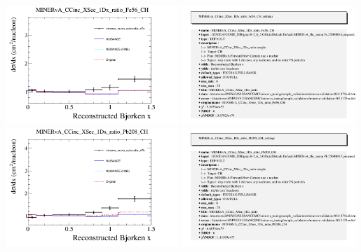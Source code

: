 \documentclass{article}
\begin{document}
\centering
\includegraphics[width=0.49\textwidth]{figures/minerva_numu_ccincratio_xFe_comp.png}
\includegraphics[width=0.49\textwidth]{figures/minerva_numu_ccincratio_xFe_info.png}
\centering
\includegraphics[width=0.49\textwidth]{figures/minerva_numu_ccincratio_xPb_comp.png}
\includegraphics[width=0.49\textwidth]{figures/minerva_numu_ccincratio_xPb_info.png}
\end{document}

